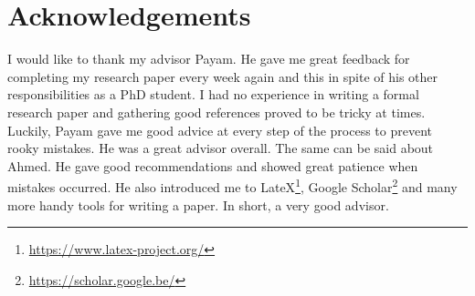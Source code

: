 \section*{Acknowledgements}
I would like to thank my advisor Payam. He gave me great feedback for completing my research paper every week again and this in spite of his other responsibilities as a PhD student. I had no experience in writing a formal research paper and gathering good references proved to be tricky at times. Luckily, Payam gave me good advice at every step of the process to prevent rooky mistakes. He was a great advisor overall.
\newline
The same can be said about Ahmed. He gave good recommendations and showed great patience when mistakes occurred. He also introduced me to LateX\footnote{\protect\url{https://www.latex-project.org/}}, Google Scholar\footnote{\protect\url{https://scholar.google.be/}} and many more handy tools for writing a paper. In short, a very good advisor.

